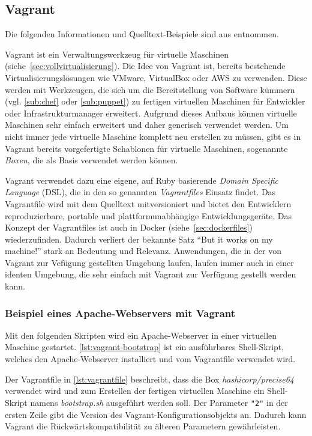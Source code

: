 \subsection{Vagrant}
\label{sub:vagrant}
Die folgenden Informationen und Quelltext-Beispiele sind aus \autocite{Vagrant:online} entnommen.

Vagrant ist ein Verwaltungswerkzeug für virtuelle Maschinen (siehe~\cref{sec:vollvirtualisierung}).
Die Idee von Vagrant ist, bereits bestehende Virtualisierungslösungen wie VMware, VirtualBox oder AWS zu verwenden.
Diese werden mit Werkzeugen, die sich um die Bereitstellung von Software kümmern (vgl. \cref{sub:chef} oder \cref{sub:puppet}) zu fertigen virtuellen Maschinen für Entwickler oder Infrastrukturmanager erweitert.
Aufgrund dieses Aufbaus können virtuelle Maschinen sehr einfach erweitert und daher generisch verwendet werden.
Um nicht immer jede virtuelle Maschine komplett neu erstellen zu müssen, gibt es in Vagrant bereits vorgefertigte Schablonen für virtuelle Maschinen, sogenannte \emph{Boxen}, die als Basis verwendet werden können.

Vagrant verwendet dazu eine eigene, auf Ruby basierende \emph{Domain Specific Language} (DSL), die in den so genannten \emph{Vagrantfiles} Einsatz findet.
Das Vagrantfile wird mit dem Quelltext mitversioniert und bietet den Entwicklern reproduzierbare, portable und plattformunabhängige Entwicklungsgeräte.
Das Konzept der Vagrantfiles ist auch in Docker (siehe~\cref{sec:dockerfiles}) wiederzufinden.
Dadurch verliert der bekannte Satz ``But it works on my machine!'' stark an Bedeutung und Relevanz.
Anwendungen, die in der von Vagrant zur Vefügung gestellten Umgebung laufen, laufen immer auch in einer identen Umgebung, die sehr einfach mit Vagrant zur Verfügung gestellt werden kann.

\subsubsection{Beispiel eines Apache-Webservers mit Vagrant}
Mit den folgenden Skripten wird ein Apache-Webserver in einer virtuellen Maschine gestartet.
\cref{lst:vagrant-bootstrap} ist ein ausführbares Shell-Skript, welches den Apache-Webserver installiert und vom Vagrantfile verwendet wird.


Der Vagrantfile in \cref{lst:vagrantfile} beschreibt, dass die Box \emph{hashicorp/precise64} verwendet wird und zum Erstellen der fertigen virtuellen Maschine ein Shell-Skript namens \emph{bootstrap.sh} ausgeführt werden soll.
Der Parameter \lstinline{"2"} in der ersten Zeile gibt die Version des Vagrant-Konfigurationsobjekts an.
Dadurch kann Vagrant die Rückwärtskompatibilität zu älteren Parametern gewährleisten.

